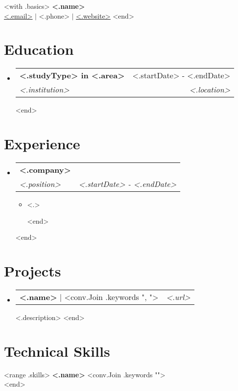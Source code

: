 \documentclass[letterpaper,12pt]{article}
\makeatletter
\newcommand{\resumeItem}[1]{
  \item\small{
    {#1 \vspace{-2pt}}
  }
}
\newcommand{\resumeSubheading}[4]{
  \vspace{-2pt}\item
    \begin{tabular*}{0.97\textwidth}[t]{l@{\extracolsep{\fill}}r}
      \textbf{#1} & #2 \\
      \textit{#3} & \textit{ #4} \\
    \end{tabular*}\vspace{-7pt}
}
\newcommand{\resumeProjectHeading}[4]{
  \vspace{-2pt}\item
    \begin{tabular*}{0.97\textwidth}[t]{l@{\extracolsep{\fill}}r}
      \textbf{#1} | #2 & \textit{\small#3} \\
    \end{tabular*}
}
\newcommand{\resumeSubHeadingListStart}{\begin{itemize}[leftmargin=0.15in, label={}]}
\newcommand{\resumeSubHeadingListEnd}{\end{itemize}}
\newcommand{\resumeItemListStart}{\begin{itemize}}
\newcommand{\resumeItemListEnd}{\end{itemize}\vspace{-5pt}}
\makeatother
\begin{document}
\begin{center}
	<with .basics>
    \textbf{\Huge <.name>} \\ \vspace{1pt}
    \href{mailto:<.email>}{\ul{<.email>}} $|$ 
    \small <.phone> $|$ 
    \href{<.website>}{\ul{<.website>}}
	<end>
\end{center}


\section{Education}
  \resumeSubHeadingListStart
    <range .education>
    \resumeSubheading
      {<.studyType> in <.area>}{<.startDate> - <.endDate>}
      {<.institution>}{<.location>}
	<end>
  \resumeSubHeadingListEnd



\section{Experience}
  \resumeSubHeadingListStart
    <range .work>
    \resumeSubheading
      {<.company>}{}
	  {<.position>}{<.startDate> - <.endDate>}
      \resumeItemListStart
	    <range .highlights>
        \resumeItem{<.>}
        <end>
      \resumeItemListEnd
	<end>
  \resumeSubHeadingListEnd


\section{Projects}
  \resumeSubHeadingListStart
    <range .projects>
    \resumeProjectHeading
        {<.name>}{<conv.Join .keywords ", ">}{<.url>}
        \resumeItem{<.description>}
    <end>
  \resumeSubHeadingListEnd

%
\section{Technical Skills}
 \begin{itemize}[leftmargin=0.15in, label={}]
    \small{\item{
	  <range .skills>
      \textbf{<.name>}{ <conv.Join .keywords "">} \\
	  <end>
    }}
 \end{itemize}


\end{document}
